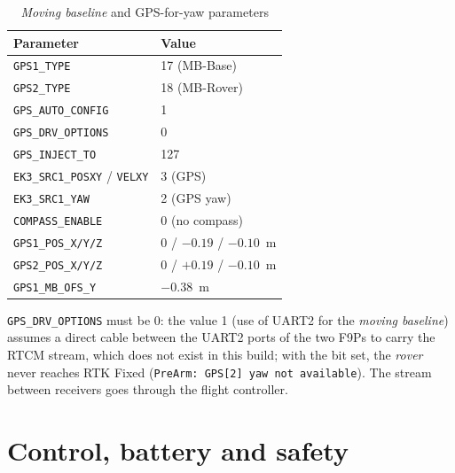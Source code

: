 \begin{table}[H]
    \centering
    \caption{\emph{Moving baseline} and GPS-for-yaw parameters}
    \label{tab:params-gps-mb}
    \begin{tabular}{ll}
        \toprule
        Parameter & Value \\
        \midrule
        \texttt{GPS1\_TYPE} & 17 (MB-Base) \\
        \texttt{GPS2\_TYPE} & 18 (MB-Rover) \\
        \texttt{GPS\_AUTO\_CONFIG} & 1 \\
        \texttt{GPS\_DRV\_OPTIONS} & 0 \\
        \texttt{GPS\_INJECT\_TO} & 127 \\
        \texttt{EK3\_SRC1\_POSXY} / \texttt{VELXY} & 3 (GPS) \\
        \texttt{EK3\_SRC1\_YAW} & 2 (GPS yaw) \\
        \texttt{COMPASS\_ENABLE} & 0 (no compass) \\
        \texttt{GPS1\_POS\_X/Y/Z} & $0$ / $-0.19$ / $-0.10$~m \\
        \texttt{GPS2\_POS\_X/Y/Z} & $0$ / $+0.19$ / $-0.10$~m \\
        \texttt{GPS1\_MB\_OFS\_Y} & $-0.38$~m \\
        \bottomrule
    \end{tabular}
\end{table}

\texttt{GPS\_DRV\_OPTIONS} must be 0: the value 1 (use of UART2 for the \emph{moving baseline}) assumes a direct cable between the UART2 ports of the two F9Ps to carry the RTCM stream, which does not exist in this build; with the bit set, the \emph{rover} never reaches RTK Fixed (\texttt{PreArm: GPS[2] yaw not available}). The stream between receivers goes through the flight controller.

\section{Control, battery and safety}
\label{sec:params-control}

